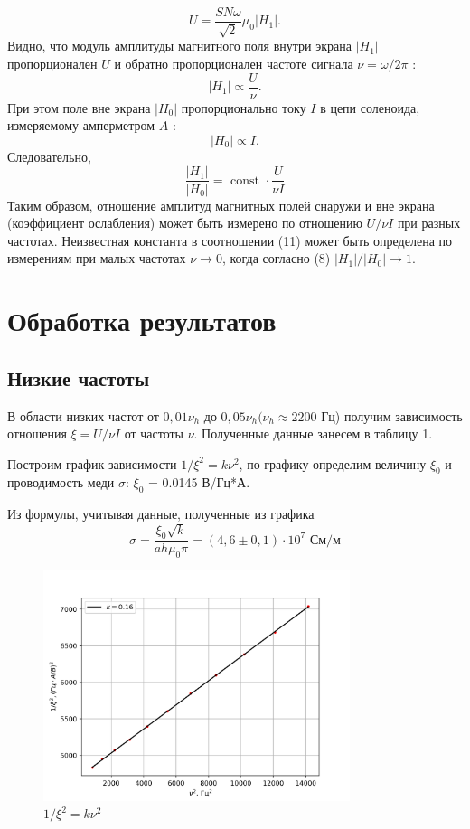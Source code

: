 \documentclass[a4paper, 12pt]{article}
\begin{document}
$$
U=\frac{S N \omega}{\sqrt{2}} \mu_0\left|H_1\right| .
$$
Видно, что модуль амплитуды магнитного поля внутри экрана $\left|H_1\right|$ пропорционален $U$ и обратно пропорционален частоте сигнала $\nu=\omega / 2 \pi$ :
$$
\left|H_1\right| \propto \frac{U}{\nu} .
$$
При этом поле вне экрана $\left|H_0\right|$ пропорционально току $I$ в цепи соленоида, измеряемому амперметром $A$ :
$$
\left|H_0\right| \propto I .
$$
Следовательно,
\begin{equation}
\frac{\left|H_1\right|}{\left|H_0\right|}=\text { const } \cdot \frac{U}{\nu I}
\end{equation}
Таким образом, отношение амплитуд магнитных полей снаружи и вне экрана (коэффициент ослабления) может быть измерено по отношению $U / \nu I$ при разных частотах. Неизвестная константа в соотношении (11) может быть определена по измерениям при малых частотах $\nu \rightarrow 0$, когда согласно (8) $\left|H_1\right| /\left|H_0\right| \rightarrow 1$.


\section{Обработка результатов}
\subsection*{Низкие частоты}
В области низких частот от $ 0,01\nu_h \text{ до }  0,05\nu_h (\nu_h \approx 2200$ Гц) получим зависимость отношения $\xi = U/\nu I $ от частоты $\nu$. Полученные данные занесем в таблицу 1.

Построим график зависимости $1/\xi^2 = k \nu^2$, по графику определим величину $\xi_0$ и проводимость меди $\sigma$: $\xi_0$ = 0.0145 В/Гц*А.

Из формулы, учитывая данные, полученные из графика
\begin{equation}
	\sigma = \frac{\xi_0 \sqrt{k}}{ah\mu_0\pi} = (4,6 \pm 0,1) \cdot 10^7 \text{ См/м}
\end{equation} 

\begin{figure}[H]
    \centering
    \includegraphics[width=0.8\textwidth]{nu2}
    \caption{$1/\xi^2 = k \nu^2$}
    \label{fig:nu2}
\end{figure}
\end{document}

